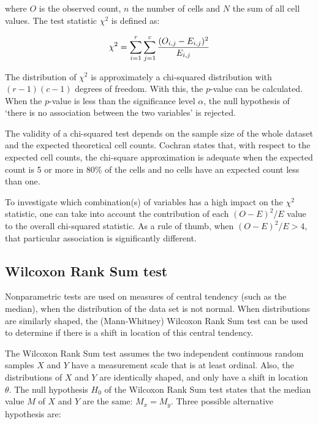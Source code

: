 where $O$ is the observed count, $n$ the number of cells and $N$ the sum of all cell values. The test statistic $\chi^2$ is defined as:

\begin{equation}
\chi^2 = \sum_{i=1}^{r} \sum_{j=1}^{c} {(O_{i,j} - E_{i,j})^2 \over E_{i,j}} 
\end{equation}

The distribution of $\chi^2$ is approximately a chi-squared distribution with $(r-1)(c-1)$ degrees of freedom. With this, the $p$-value can be calculated. When the $p$-value is less than the significance level $\alpha$, the null hypothesis of `there is no association between the two variables' is rejected.

The validity of a chi-squared test depends on the sample size of the whole dataset and the expected theoretical cell counts. Cochran \cite{Cochran1954} states that, with respect to the expected cell counts, the chi-square approximation is adequate when the expected count is 5 or more in 80\% of the cells and no cells have an expected count less than one.

To investigate which combination(s) of variables has a high impact on the $\chi^2$ statistic, one can take into account the contribution of each $(O-E)^2/E$ value to the overall chi-squared statistic. As a rule of thumb, when $(O-E)^2/E > 4$, that particular association is significantly different.


\subsection{Wilcoxon Rank Sum test} %
\label{sub:wilcoxon_rank_sum_test}
Nonparametric tests are used on measures of central tendency (such as the median), when the distribution of the data set is not normal. When distributions are similarly shaped, the (Mann-Whitney) Wilcoxon Rank Sum test \cite{Wilcoxon1945, Mann1947} can be used to determine if there is a shift in location of this central tendency.

The Wilcoxon Rank Sum test assumes the two independent continuous random samples $X$ and $Y$ have a measurement scale that is at least ordinal. Also, the distributions of $X$ and $Y$ are identically shaped, and only have a shift in location $\theta$. The null hypothesis $H_0$ of the Wilcoxon Rank Sum test states that the median value $M$ of $X$ and $Y$ are the same: $M_x = M_y$. Three possible alternative hypothesis are:

